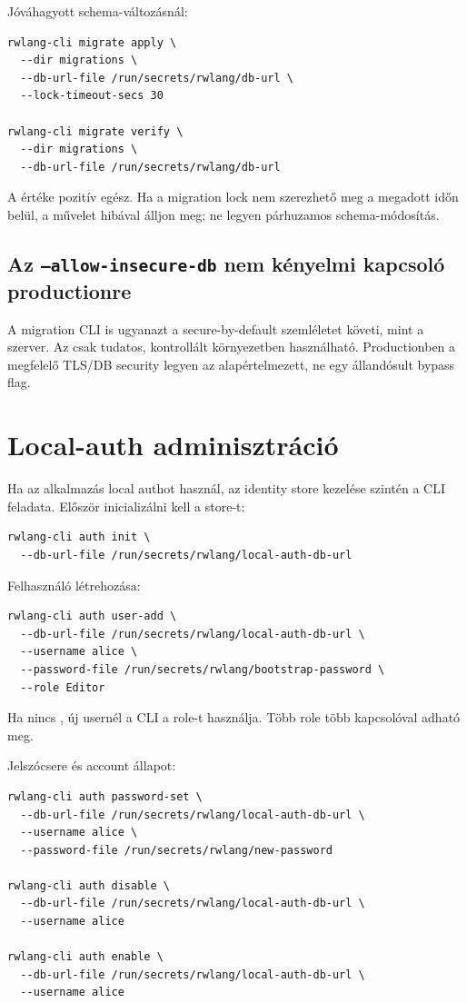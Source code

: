Jóváhagyott schema-változásnál:

\begin{lstlisting}
rwlang-cli migrate apply \
  --dir migrations \
  --db-url-file /run/secrets/rwlang/db-url \
  --lock-timeout-secs 30

rwlang-cli migrate verify \
  --dir migrations \
  --db-url-file /run/secrets/rwlang/db-url
\end{lstlisting}

A \code{--lock-timeout-secs} értéke pozitív egész. Ha a migration lock nem szerezhető meg a megadott időn belül, a művelet hibával álljon meg; ne legyen párhuzamos schema-módosítás.

\subsection*{Az \texttt{--allow-insecure-db} nem kényelmi kapcsoló productionre}

A migration CLI is ugyanazt a secure-by-default szemléletet követi, mint a szerver. Az  csak tudatos, kontrollált környezetben használható. Productionben a megfelelő TLS/DB security legyen az alapértelmezett, ne egy állandósult bypass flag.

\section{Local-auth adminisztráció}

Ha az alkalmazás local authot használ, az identity store kezelése szintén a CLI feladata. Először inicializálni kell a store-t:

\begin{lstlisting}
rwlang-cli auth init \
  --db-url-file /run/secrets/rwlang/local-auth-db-url
\end{lstlisting}

Felhasználó létrehozása:

\begin{lstlisting}
rwlang-cli auth user-add \
  --db-url-file /run/secrets/rwlang/local-auth-db-url \
  --username alice \
  --password-file /run/secrets/rwlang/bootstrap-password \
  --role Editor
\end{lstlisting}

Ha nincs \code{--role}, új usernél a CLI a  role-t használja. Több role több  kapcsolóval adható meg.

Jelszócsere és account állapot:

\begin{lstlisting}
rwlang-cli auth password-set \
  --db-url-file /run/secrets/rwlang/local-auth-db-url \
  --username alice \
  --password-file /run/secrets/rwlang/new-password

rwlang-cli auth disable \
  --db-url-file /run/secrets/rwlang/local-auth-db-url \
  --username alice

rwlang-cli auth enable \
  --db-url-file /run/secrets/rwlang/local-auth-db-url \
  --username alice
\end{lstlisting}

